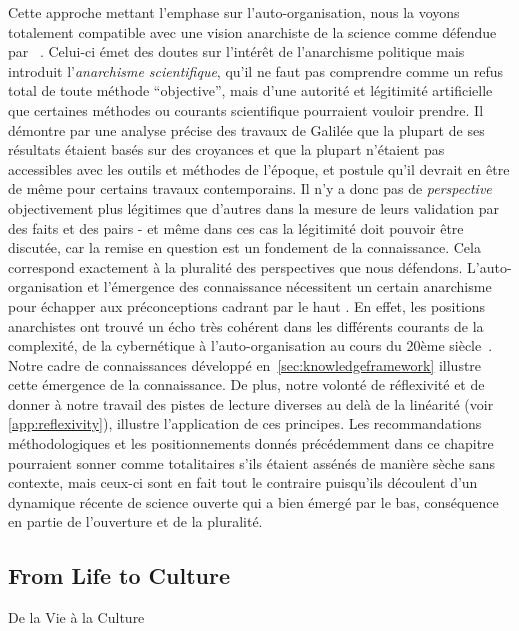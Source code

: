 Cette approche mettant l'emphase sur l'auto-organisation, nous la voyons totalement compatible avec une vision anarchiste de la science comme défendue par ~\cite{feyerabend1993against}. Celui-ci émet des doutes sur l'intérêt de l'anarchisme politique mais introduit l'\emph{anarchisme scientifique}, qu'il ne faut pas comprendre comme un refus total de toute méthode ``objective'', mais d'une autorité et légitimité artificielle que certaines méthodes ou courants scientifique pourraient vouloir prendre. Il démontre par une analyse précise des travaux de Galilée que la plupart de ses résultats étaient basés sur des croyances et que la plupart n'étaient pas accessibles avec les outils et méthodes de l'époque, et postule qu'il devrait en être de même pour certains travaux contemporains. Il n'y a donc pas de \emph{perspective} objectivement plus légitimes que d'autres dans la mesure de leurs validation par des faits et des pairs - et même dans ces cas la légitimité doit pouvoir être discutée, car la remise en question est un fondement de la connaissance. Cela correspond exactement à la pluralité des perspectives que nous défendons. L'auto-organisation et l'émergence des connaissance nécessitent un certain anarchisme pour échapper aux préconceptions cadrant par le haut . En effet, les positions anarchistes ont trouvé un écho très cohérent dans les différents courants de la complexité, de la cybernétique à l'auto-organisation au cours du 20ème siècle~\cite{duda2013cybernetics}. Notre cadre de connaissances développé en~\ref{sec:knowledgeframework} illustre cette émergence de la connaissance. De plus, notre volonté de réflexivité et de donner à notre travail des pistes de lecture diverses au delà de la linéarité (voir \ref{app:reflexivity}), illustre l'application de ces principes. Les recommandations méthodologiques et les positionnements donnés précédemment dans ce chapitre pourraient sonner comme totalitaires s'ils étaient assénés de manière sèche sans contexte, mais ceux-ci sont en fait tout le contraire puisqu'ils découlent d'un dynamique récente de science ouverte qui a bien émergé par le bas, conséquence en partie de l'ouverture et de la pluralité.







\subsection{From Life to Culture}{De la Vie à la Culture}


